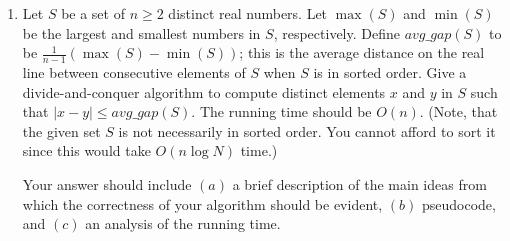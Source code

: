 \documentclass[a4paper]{article}
\begin{document}
\begin{enumerate}
  \item Let $S$ be a set of $n \geq 2$ distinct real numbers. Let $\max(S)$ and $\min(S)$ be the largest and smallest numbers in $S$, respectively.
    Define $avg\_gap(S)$ to be $\frac{1}{n-1} (\max(S) - \min(S))$; this is the average distance on the real line between consecutive elements of $S$
    when $S$ is in sorted order. Give a divide-and-conquer algorithm to compute distinct elements $x$ and $y$ in $S$ such that $|x-y| \leq
    avg\_gap(S)$. The running time should be $O(n)$. (Note, that the given set $S$ is not necessarily in sorted order. You cannot afford to sort it
    since this would take $O(n \log N)$ time.)

    Your answer should include $(a)$ a brief description of the main ideas from which the correctness of your algorithm should be evident, $(b)$
    pseudocode, and $(c)$ an analysis of the running time.
\end{enumerate}
\end{document}
